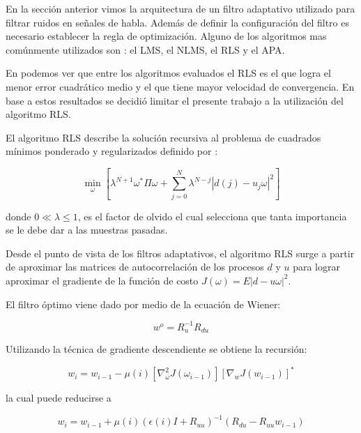 En la sección anterior vimos la arquitectura de un filtro adaptativo utilizado para filtrar ruidos en señales de habla. Además de definir la configuración del filtro es necesario establecer la regla de optimización. Alguno de los algoritmos mas comúnmente utilizados son \cite{a_family_of_adaptive_filter_slgorithms_in_noise_cancellation_for_speech_enhancement}: el LMS, el NLMS, el RLS y el APA.

En \cite{a_family_of_adaptive_filter_slgorithms_in_noise_cancellation_for_speech_enhancement} podemos ver que entre los algoritmos evaluados el RLS es el que logra el menor error cuadrático medio y el que tiene mayor velocidad de convergencia. En base a estos resultados se decidió limitar el presente trabajo a la utilización del algoritmo RLS. 

El algoritmo RLS describe la solución recursiva al problema de cuadrados mínimos ponderado y regularizados definido por \cite{fundamentals_of_adaptive_filtering}:

\begin{equation*}
	\min_{ \omega} \left[\lambda^{N+1} \omega^* \Pi \omega + \sum_{j=0}^N \lambda^{N-j} |d(j) - u_j \omega |^2 \right]
\end{equation*}

donde $ 0 \ll \lambda \leq 1$, es el factor de olvido el cual selecciona que tanta importancia se le debe dar a las muestras pasadas. 

Desde el punto de vista de los filtros adaptativos, el algoritmo RLS surge a partir de aproximar las matrices de autocorrelación de los procesos $d$ y $u$ para lograr aproximar el gradiente de la función de costo $J(\omega) = E | d - u \omega |^2$.

El filtro óptimo viene dado por medio de la ecuación de Wiener:

\begin{equation*}
	w^o = R_u^{-1}R_{du}
\end{equation*}

Utilizando la técnica de gradiente descendiente se obtiene la recursión:

\begin{equation*}
	w_i = w_{i-1} - \mu(i) \left[ \nabla^2_\omega J(\omega_{i-1}) \right] \left[ \nabla_w J(w_{i-1}) \right]^*
\end{equation*}

la cual puede reducirse a \cite{fundamentals_of_adaptive_filtering}

\begin{equation*}
	w_i = w_{i-1} + \mu(i) (\epsilon(i) I + R_{uu} )^{-1} \left( R_{du} - R_{uu} w_{i-1} \right)
\end{equation*}

